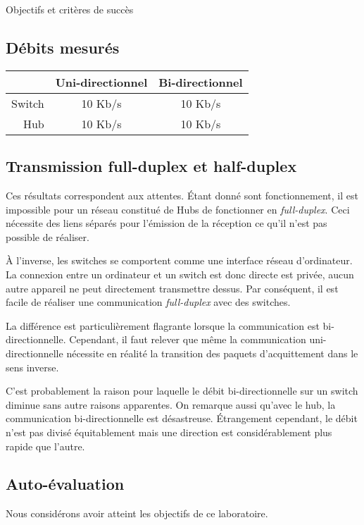 \documentclass[11pt,a4paper]{article}
\begin{document}
Objectifs et critères de succès

\subsection{Débits mesurés}

\begin{tabular}{r|c|c}
	& Uni-directionnel & Bi-directionnel \\
	\hline
	Switch & 10 Kb/s & 10 Kb/s \\
	Hub & 10 Kb/s & 10 Kb/s \\
\end{tabular}

\subsection{Transmission full-duplex et half-duplex}

Ces résultats correspondent aux attentes. Étant donné sont fonctionnement, il est impossible pour un réseau constitué de Hubs de fonctionner en \textit{full-duplex}. Ceci nécessite des liens séparés pour l'émission de la réception ce qu'il n'est pas possible de réaliser.

À l'inverse, les switches se comportent comme une interface réseau d'ordinateur. La connexion entre un ordinateur et un switch est donc directe est privée, aucun autre appareil ne peut directement transmettre dessus. Par conséquent, il est facile de réaliser une communication \textit{full-duplex} avec des switches.

La différence est particulièrement flagrante lorsque la communication est bi-directionnelle. Cependant, il faut relever que même la communication uni-directionnelle nécessite en réalité la transition des paquets d'acquittement dans le sens inverse.

C'est probablement la raison pour laquelle le débit bi-directionnelle sur un switch diminue sans autre raisons apparentes. On remarque aussi qu'avec le hub, la communication bi-directionnelle est désastreuse. Étrangement cependant, le débit n'est pas divisé équitablement mais une direction est considérablement plus rapide que l'autre.

\subsection{Auto-évaluation}

Nous considérons avoir atteint les objectifs de ce laboratoire.
\end{document}
